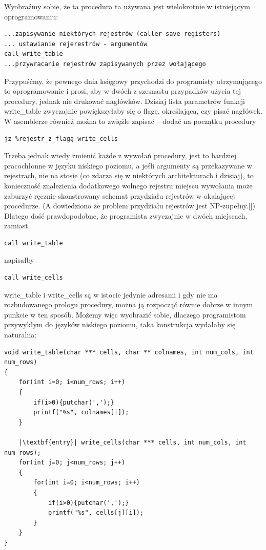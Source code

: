 Wyobraźmy sobie, że ta procedura ta używana jest wielokrotnie w istniejącym oprogramowaniu:
\begin{lstlisting}
...zapisywanie niektórych rejestrów (caller-save registers)
... ustawianie rejerestrów - argumentów
call write_table
...przywracanie rejestrów zapisywanych przez wołającego
\end{lstlisting}
Przypuśćmy, że pewnego dnia księgowy przychodzi do programisty utrzymującego to oprogramowanie i prosi, aby w dwóch z szesnastu przypadków użycia tej procedury, jednak nie drukować nagłówków. Dzisiaj lista parametrów funkcji write\_table zwyczajnie powiększyłaby się o flagę, określającą, czy pisać nagłówek. W asemblerze również można to zwięźle zapisać – dodać na początku procedury
\begin{lstlisting}
jz %rejestr_z_flagą write_cells
\end{lstlisting}
Trzeba jednak wtedy zmienić każde z wywołań procedury, jest to bardziej pracochłonne w języku niskiego poziomu, a jeśli argumenty są przekazywane w rejestrach, nie na stosie (co zdarza się w niektórych architekturach i dzisiaj), to konieczność znalezienia dodatkowego wolnego rejestru miejscu wywołania może zaburzyć ręcznie skonstrowany schemat przydziału rejestrów w okalającej procedurze. (A dowiedziono że problem przydziału rejestrów jest NP-zupełny.[]) Dlatego dość prawdopodobne, że programista zwyczajnie w dwóch miejscach, zamiast
\begin{lstlisting}
call write_table
\end{lstlisting}
napisałby 
\begin{lstlisting}
call write_cells
\end{lstlisting}
write\_table i write\_cells są w istocie jedynie adresami i gdy nie ma rozbudowanego prologu procedury, można ją rozpocząć równie dobrze w innym punkcie w ten sposób. Możemy więc wyobrazić sobie, dlaczego programistom przywykłym do języków niskiego poziomu, taka konstrukcja wydałaby się naturalna:
\lstset{
    escapechar=|,
    breaklines=true
}
\begin{lstlisting}
void write_table(char *** cells, char ** colnames, int num_cols, int num_rows)
{
    for(int i=0; i<num_rows; i++)
    {
        if(i>0){putchar(',');}
        printf("%s", colnames[i]);
    }
    
    |\textbf{entry}| write_cells(char *** cells, int num_cols, int num_rows);
    for(int j=0; j<num_rows; j++)
    {
        for(int i=0; i<num_rows; i++)
        {
            if(i>0){putchar(',');}
            printf("%s", cells[j][i]);
        }
    }
}
\end{lstlisting}

